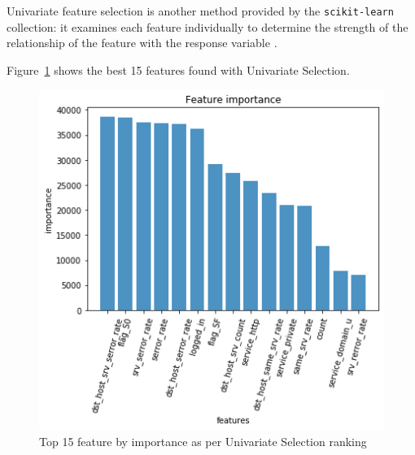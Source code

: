 Univariate feature selection is another method provided by the \texttt{scikit-learn} collection: it examines each feature individually to determine the strength of the relationship of the feature with the response variable \cite{univ}.

Figure~\ref{fig:classuniv} shows the best 15 features found with Univariate Selection. 

\begin{figure}[h]
    \centering
    \includegraphics[width=0.7\linewidth]{img/univ.png}
    \caption{Top 15 feature by importance as per Univariate Selection ranking}
    \label{fig:classuniv}
\end{figure}

\FloatBarrier